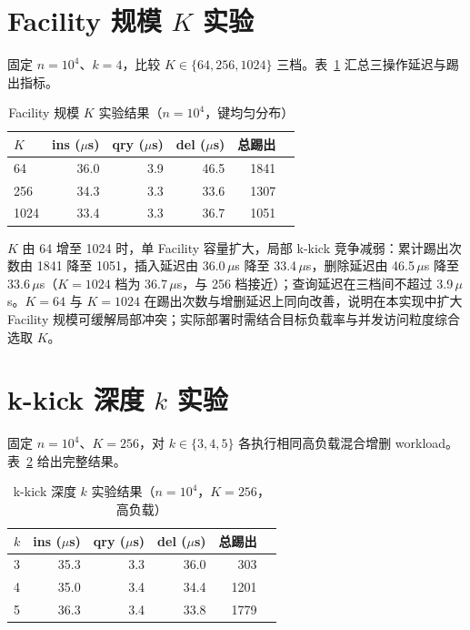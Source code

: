 \section{Facility 规模 \texorpdfstring{$K$}{K} 实验}

固定 \(n=10^4\)、\(k=4\)，比较 \(K\in\{64,256,1024\}\) 三档。表~\ref{tab:exp-K-fixed} 汇总三操作延迟与踢出指标。

\begin{table}[htbp]
  \centering
  \caption{Facility 规模 \(K\) 实验结果（\(n=10^4\)，键均匀分布）}
  \label{tab:exp-K-fixed}
  \small
  \begin{tabular}{lrrrrr}
    \toprule
    $K$ &
    ins ($\mu$s) & qry ($\mu$s) & del ($\mu$s) &
    总踢出 \\
    \midrule
    64    & 36.0 & 3.9 & 46.5 & 1841 \\
    256   & 34.3 & 3.3 & 33.6 & 1307 \\
    1024  & 33.4 & 3.3 & 36.7 & 1051 \\
    \bottomrule
  \end{tabular}
\end{table}

\(K\) 由 64 增至 1024 时，单 Facility 容量扩大，局部 k-kick 竞争减弱：累计踢出次数由 1841 降至 1051，插入延迟由 36.0\,$\mu$s 降至 33.4\,$\mu$s，删除延迟由 46.5\,$\mu$s 降至 33.6\,$\mu$s（\(K=1024\) 档为 36.7\,$\mu$s，与 256 档接近）；查询延迟在三档间不超过 3.9\,$\mu$s。\(K=64\) 与 \(K=1024\) 在踢出次数与增删延迟上同向改善，说明在本实现中扩大 Facility 规模可缓解局部冲突；实际部署时需结合目标负载率与并发访问粒度综合选取 \(K\)\cite{bender2022otsh,bender2024sosa}。

\section{k-kick 深度 \texorpdfstring{$k$}{k} 实验}

固定 \(n=10^4\)、\(K=256\)，对 \(k\in\{3,4,5\}\) 各执行相同高负载混合增删 workload。表~\ref{tab:exp-k-fixed} 给出完整结果。

\begin{table}[htbp]
  \centering
  \caption{k-kick 深度 \(k\) 实验结果（\(n=10^4\)，\(K=256\)，高负载）}
  \label{tab:exp-k-fixed}
  \small
  \begin{tabular}{lrrrrr}
    \toprule
    $k$ &
    ins ($\mu$s) & qry ($\mu$s) & del ($\mu$s) &
    总踢出 \\
    \midrule
    3 & 35.3 & 3.3 & 36.0 & 303  \\
    4 & 35.0 & 3.4 & 34.4 & 1201 \\
    5 & 36.3 & 3.4 & 33.8 & 1779 \\
    \bottomrule
  \end{tabular}
\end{table}

